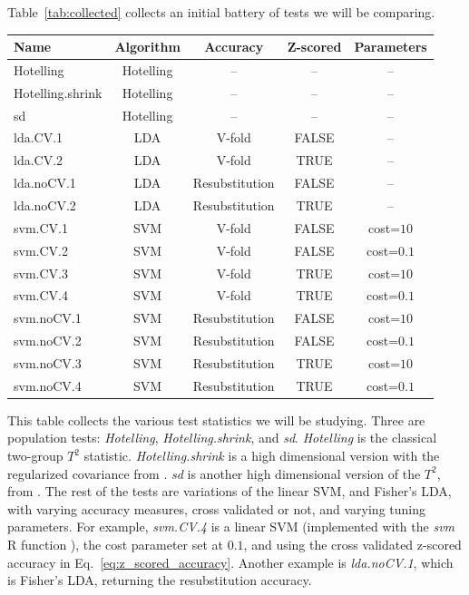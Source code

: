 \documentclass[12pt,a4paper]{article}
\theoremstyle{definition}
\newcommand{\R}{\textsf{R }}
\begin{document}
Table~\ref{tab:collected} collects an initial battery of tests we will be comparing. 
\begin{tcolorbox}
\centering
\begin{tabular}{l|c|c|c|c}
Name & Algorithm & Accuracy & Z-scored & Parameters\\ 
\hline
\hline
Hotelling & Hotelling & -- & -- & -- \\ 
Hotelling.shrink & Hotelling & -- & -- & -- \\ 
sd & Hotelling & -- & -- & -- \\ 
lda.CV.1 	& LDA & V-fold 			& FALSE 	&  -- \\ 
lda.CV.2 	& LDA & V-fold 			& TRUE 	& -- \\ 
lda.noCV.1 	& LDA & Resubstitution 	& FALSE 	&  --\\ 
lda.noCV.2 	& LDA & Resubstitution 	& TRUE 	&  --\\ 
svm.CV.1 	& SVM & V-fold 			& FALSE & cost=$10$ \\ 
svm.CV.2 	& SVM & V-fold 			& FALSE & cost=$0.1$ \\ 
svm.CV.3 	& SVM & V-fold 			& TRUE 	& cost=$10$ \\ 
svm.CV.4 	& SVM & V-fold 			& TRUE 	& cost=$0.1$ \\ 
svm.noCV.1 	& SVM & Resubstitution 	& FALSE & cost=$10$ \\ 
svm.noCV.2 	& SVM & Resubstitution 	& FALSE & cost=$0.1$ \\ 
svm.noCV.3 	& SVM & Resubstitution 	& TRUE 	& cost=$10$ \\ 
svm.noCV.4 	& SVM & Resubstitution 	& TRUE 	& cost=$0.1$ \\
\end{tabular} 
\captionsetup{type=table}
\caption{\footnotesize
This table collects the various test statistics we will be studying. 
Three are population tests: \emph{Hotelling}, \emph{Hotelling.shrink}, and \emph{sd}.
\textit{Hotelling} is the classical two-group $T^2$ statistic. 
\textit{Hotelling.shrink} is a high dimensional version with the regularized covariance from \citet{schafer_shrinkage_2005}. 
\textit{sd} is another high dimensional version of the $T^2$, from \citet{srivastava_two_2013}.
The rest of the tests are variations of the linear SVM, and Fisher's LDA, with varying accuracy measures, cross validated or not, and varying tuning parameters. 
For example, \textit{svm.CV.4} is a linear SVM (implemented with the \emph{svm} \R function \citep{meyer_e1071:_2015}),
the cost parameter set at $0.1$, and using the cross validated z-scored accuracy in Eq.~\ref{eq:z_scored_accuracy}.
Another example is \textit{lda.noCV.1}, which is Fisher's LDA, returning the resubstitution accuracy.}
\label{tab:collected}
\end{tcolorbox}
\end{document}
